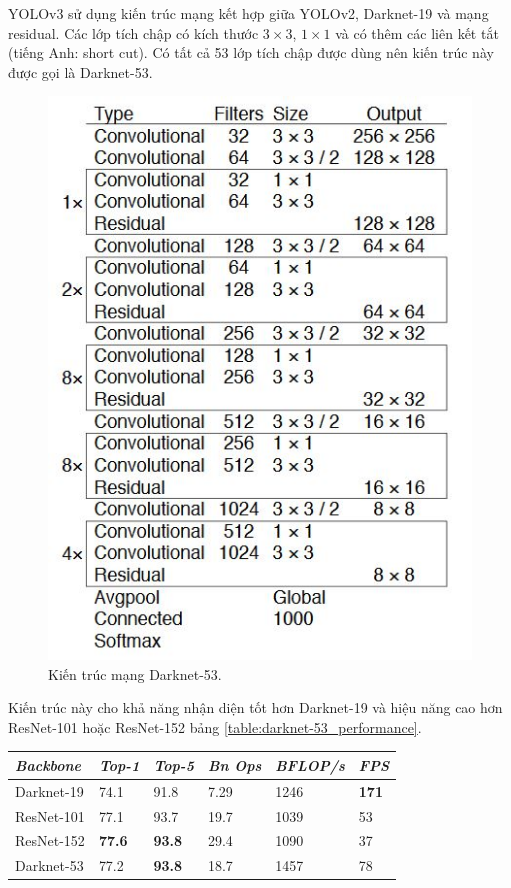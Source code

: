 YOLOv3 sử dụng kiến trúc mạng kết hợp giữa YOLOv2, Darknet-19 và mạng residual. Các lớp tích chập có kích thước $3 \times 3$, $1 \times 1$ và có thêm các liên kết tắt (tiếng Anh: short cut). Có tất cả 53 lớp tích chập được dùng nên kiến trúc này được gọi là Darknet-53.
\begin{figure}[ht!]
	\centerline{\includegraphics[scale=0.8]{images/yolov3_architecture.jpg}}
  	\caption{Kiến trúc mạng Darknet-53.}
  	\label{fig:bounding_box_prediction}
\end{figure}
Kiến trúc này cho khả năng nhận diện tốt hơn Darknet-19 và hiệu năng cao hơn ResNet-101 hoặc ResNet-152 bảng \ref{table:darknet-53_performance}.
\begin{center}

  \begin{tabular} {l l l l l l}
  \toprule
  \it Backbone & \it Top-1 & \it Top-5 & \it Bn Ops & \it BFLOP/s & \it FPS \\
  \midrule

  Darknet-19 & 74.1 & 91.8 & 7.29 & 1246 & \textbf{171} \\
  ResNet-101 & 77.1 & 93.7 & 19.7 & 1039 & 53 \\
  ResNet-152 & \textbf{77.6} & \textbf{93.8} & 29.4 & 1090 & 37 \\
  Darknet-53 & 77.2 & \textbf{93.8} & 18.7 & 1457 & 78 \\
          
  \bottomrule
  \end{tabular}

\end{center}